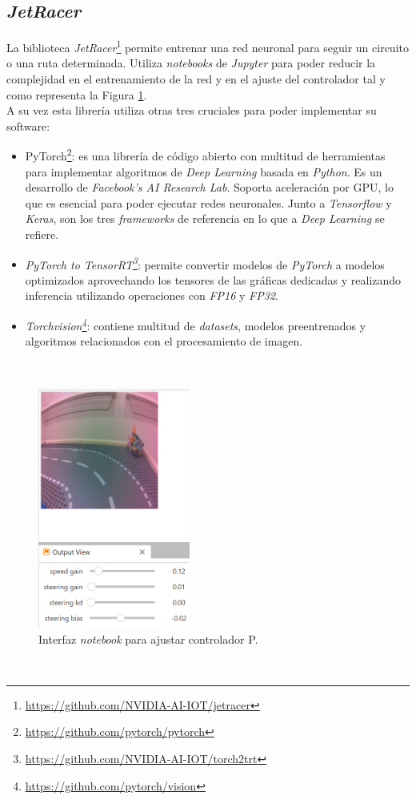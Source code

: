 \subsection{\textit{JetRacer}}
\label{subsection:jetracer}
La biblioteca \textit{JetRacer}\footnote{\url{https://github.com/NVIDIA-AI-IOT/jetracer}} permite entrenar una red neuronal para seguir un circuito o una ruta determinada. Utiliza \textit{notebooks} de \textit{Jupyter} para poder reducir la complejidad en el entrenamiento de la red y en el ajuste del controlador tal y como representa la Figura \ref{fig:livejetracer}.\\

A su vez esta librería utiliza otras tres cruciales para poder implementar su software:

\begin{itemize}
	\item PyTorch\footnote{\url{https://github.com/pytorch/pytorch}}: es una librería de código abierto con multitud de herramientas para implementar algoritmos de \textit{Deep Learning} basada en \textit{Python}\cite{autopilottesla}. Es un desarrollo de \textit{Facebook's AI Research Lab}. Soporta aceleración por GPU, lo que es esencial para poder ejecutar redes neuronales. Junto a \textit{Tensorflow} y \textit{Keras}, son los tres \textit{frameworks} de referencia en lo que a \textit{Deep Learning} se refiere.
	\item \textit{PyTorch to TensorRT\footnote{\url{https://github.com/NVIDIA-AI-IOT/torch2trt}}}: permite convertir modelos de \textit{PyTorch} a modelos optimizados aprovechando los tensores de las gráficas dedicadas y realizando inferencia utilizando operaciones con \textit{FP16} y \textit{FP32}.
	\item \textit{Torchvision\footnote{\url{https://github.com/pytorch/vision}}}: contiene multitud de \textit{datasets}, modelos preentrenados y algoritmos relacionados con el procesamiento de imagen.
\end{itemize}\

\begin{figure} [h!]
	\begin{center}
		\includegraphics[width=5cm]{figs/livejetracer}
	\end{center}
	\caption{Interfaz \textit{notebook} para ajustar controlador P.}
	\label{fig:livejetracer}
\end{figure}\
